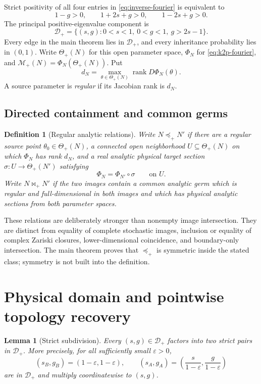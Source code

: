 \documentclass[11pt]{article}
\newtheorem{lemma}[theorem]{Lemma}
\newtheorem{definition}[theorem]{Definition}
\theoremstyle{remark}
\newcommand{\M}{\mathcal M}
\newcommand{\Dplus}{\mathcal D_+}
\newcommand{\preceqplus}{\preceq_+}
\newcommand{\bowtieplus}{\mathbin{\bowtie}_+}
\newcommand{\1}{\mathbf 1}
\begin{document}
Strict positivity of all four entries in \eqref{eq:inverse-fourier} is
equivalent to
\[
 1-g>0,\qquad 1+2s+g>0,\qquad 1-2s+g>0.
\]
The principal positive-eigenvalue component is
\begin{equation}\label{eq:Dplus}
 \Dplus=\{(s,g):0<s<1,\ 0<g<1,\ g>2s-1\}.
\end{equation}
Every edge in the main theorem lies in \(\Dplus\), and every inheritance
probability lies in \((0,1)\).  Write \(\Theta_+(N)\) for this open parameter
space, \(\Phi_N\) for \eqref{eq:k2p-fourier}, and
\(\M_+(N)=\Phi_N(\Theta_+(N))\).  Put
\[
 d_N=\max_{\theta\in\Theta_+(N)}\operatorname{rank}D\Phi_N(\theta).
\]
A source parameter is \emph{regular} if its Jacobian rank is \(d_N\).

\subsection{Directed containment and common germs}

\begin{definition}[Regular analytic relations]\label{def:relations}
Write \(N\preceqplus N'\) if there are a regular source point
\(\theta_0\in\Theta_+(N)\), a connected open neighborhood
\(U\subseteq\Theta_+(N)\) on which \(\Phi_N\) has rank \(d_N\), and a real
analytic physical target section \(\sigma:U\to\Theta_+(N')\) satisfying
\[
 \Phi_N=\Phi_{N'}\circ\sigma\qquad\text{on }U.
\]
Write \(N\bowtieplus N'\) if the two images contain a common analytic germ
which is regular and full-dimensional in both images and which has physical
analytic sections from both parameter spaces.
\end{definition}

These relations are deliberately stronger than nonempty image intersection.
They are distinct from equality of complete stochastic images, inclusion or
equality of complex Zariski closures, lower-dimensional coincidence, and
boundary-only intersection.  The main theorem proves that \(\preceqplus\) is
symmetric inside the stated class; symmetry is not built into the definition.

\section{Physical domain and pointwise topology recovery}\label{sec:pointwise}

\begin{lemma}[Strict subdivision]\label{lem:subdivision}
Every \((s,g)\in\Dplus\) factors into two strict pairs in \(\Dplus\).  More
precisely, for all sufficiently small \(\varepsilon>0\),
\[
 (s_B,g_B)=(1-\varepsilon,1-\varepsilon),\qquad
 (s_A,g_A)=\left(\frac{s}{1-\varepsilon},
                  \frac{g}{1-\varepsilon}\right)
\]
are in \(\Dplus\) and multiply coordinatewise to \((s,g)\).
\end{lemma}
\end{document}
